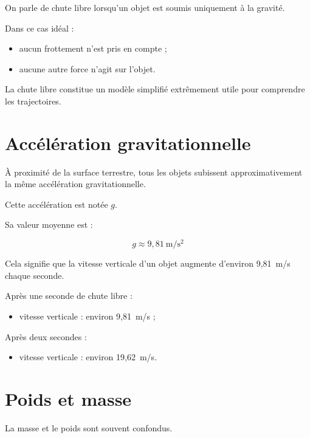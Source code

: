 On parle de chute libre lorsqu'un objet est soumis uniquement à la gravité.

Dans ce cas idéal :

\begin{itemize}
\item aucun frottement n'est pris en compte ;
\item aucune autre force n'agit sur l'objet.
\end{itemize}

La chute libre constitue un modèle simplifié extrêmement utile pour comprendre
les trajectoires.

\section{Accélération gravitationnelle}

À proximité de la surface terrestre, tous les objets subissent
approximativement la même accélération gravitationnelle.

Cette accélération est notée $g$.

Sa valeur moyenne est :

\begin{equation}
g \approx 9,81~\mathrm{m/s^2}
\label{eq:gravitation_g}
\end{equation}

Cela signifie que la vitesse verticale d'un objet augmente d'environ
9,81~m/s chaque seconde.

\begin{exemple}

Après une seconde de chute libre :

\begin{itemize}
\item vitesse verticale : environ 9,81~m/s ;
\end{itemize}

Après deux secondes :

\begin{itemize}
\item vitesse verticale : environ 19,62~m/s.
\end{itemize}

\end{exemple}

\section{Poids et masse}

La masse et le poids sont souvent confondus.

